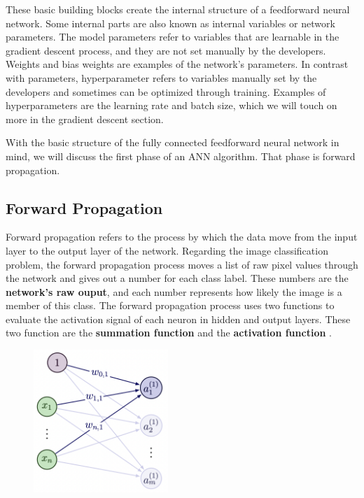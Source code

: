 These basic building blocks create the internal structure of a feedforward neural network. Some internal parts are also known as internal variables or network parameters. The model parameters refer to variables that are learnable in the gradient descent process, and they are not set manually by the developers. Weights and bias weights are examples of the network's parameters. In contrast with parameters, hyperparameter refers to variables manually set by the developers and sometimes can be optimized through training. Examples of hyperparameters are the learning rate and batch size, which we will touch on more in the gradient descent section.

With the basic structure of the fully connected feedforward neural network in mind, we will discuss the first phase of an ANN algorithm. That phase is forward propagation.

\subsection{Forward Propagation} \label{forwardprop_section}
Forward propagation refers to the process by which the data move from the input layer to the output layer of the network. Regarding the image classification problem, the forward propagation process moves a list of raw pixel values through the network and gives out a number for each class label. These numbers are the \textbf{network's raw ouput}, and each number represents how likely the image is a member of this class. The forward propagation process uses two functions to evaluate the activation signal of each neuron in hidden and output layers. These two function are the \textbf{summation function} and the \textbf{activation function} \cite{taylor2017neural}.

\begin{figure}
    \centering
    \includegraphics[width=2in]{figures/fp_diagram.png}
\end{figure}

